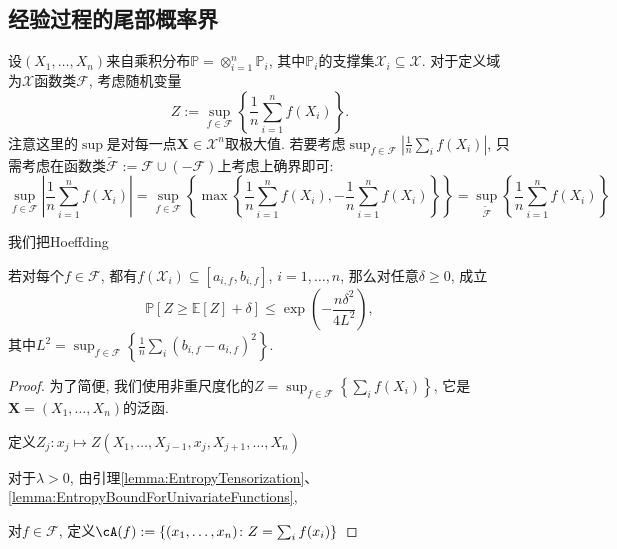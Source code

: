 \subsection{经验过程的尾部概率界}

设$(X_1, \dots, X_n)$来自乘积分布$\mathbb{P} = \otimes_{i=1}^n \mathbb{P}_i$, 其中$\mathbb{P}_i$的支撑集$\mathcal{X}_i \subseteq \mathcal{X}$. 
对于定义域为$\mathcal{X}$函数类$\mathscr{F}$, 考虑随机变量
\begin{equation*}
	Z := \sup_{f \in \mathscr{F}} \left\{ \frac{1}{n} \sum_{i=1}^n f(X_i) \right\}. 
\end{equation*}
注意这里的$\sup$是对每一点$\bm{X} \in \mathcal{X}^n$取极大值. 
若要考虑$\sup_{f \in \mathscr{F}} \left| \frac{1}{n} \sum_i f(X_i) \right|$, 只需考虑在函数类$\tilde{\mathscr{F}} := \mathscr{F} \cup (- \mathscr{F})$上考虑上确界即可: 
\begin{equation*}
	\sup_{f \in \mathscr{F}} \left| \frac{1}{n} \sum_{i=1}^n f(X_i) \right|
	= \sup_{f \in \mathscr{F}} \left\{ \max \left\{ \frac{1}{n} \sum_{i=1}^n f(X_i), - \frac{1}{n} \sum_{i=1}^n f(X_i) \right\} \right\} 
	= \sup_{\tilde{\mathscr{F}}} \left\{ \frac{1}{n} \sum_{i=1}^n f(X_i) \right\}
\end{equation*}

我们把Hoeffding

\begin{theorem}[泛函Hoeffding不等式]
	若对每个$f \in \mathscr{F}$, 都有$f(\mathcal{X}_i) \subseteq  [a_{i, f}, b_{i, f}]$, $i = 1, \dots, n$,  那么对任意$\delta \geq 0$, 成立
	\begin{equation}
		\mathbb{P}[ Z \geq \mathbb{E}[Z] + \delta] 
		\leq \exp \left( - \frac{n \delta^2}{4 L^2} \right), 
	\end{equation}
	其中$L^2 = \sup_{f \in \mathscr{F}} \left\{ \frac{1}{n} \sum_i (b_{i, f} - a_{i, f})^2 \right\}$. 
\end{theorem}

\begin{proof}
	为了简便, 我们使用非重尺度化的$Z = \sup_{f \in \mathscr{F}} \left\{ \sum_i f(X_i) \right\}$, 它是$\bm{X} = (X_1, \dots, X_n)$的泛函.  
	
	定义$Z_j \colon x_j \mapsto Z(X_1, \dots, X_{j-1}, x_j, X_{j+1}, \dots, X_n)$
	
	对于$\lambda > 0$, 由引理\ref{lemma:EntropyTensorization}、 \ref{lemma:EntropyBoundForUnivariateFunctions}, 
	
	对$f \in \mathscr{F}$, 定义$\cA(f) := \left\{ (x_1, \dots, x_n) \colon Z = \sum_i f(x_i) \right\}$
\end{proof}


